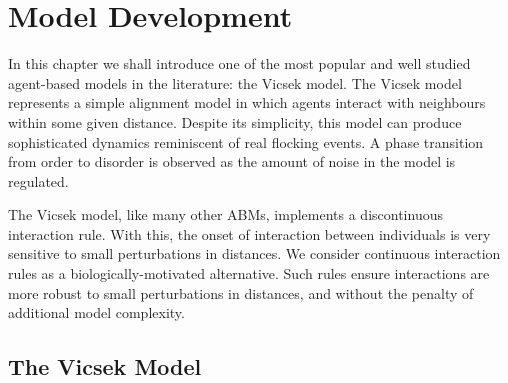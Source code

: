 \graphicspath{{fig/model_development/}}

\chapter{Model Development}
\label{cha:model_dev}

In this chapter we shall introduce one of the most popular and well studied agent-based
models in the literature: the Vicsek model. The Vicsek model represents a simple alignment
model in which agents interact with neighbours within some given distance. Despite its
simplicity, this model can produce sophisticated dynamics reminiscent of real flocking
events. A phase transition from order to disorder is observed as the amount of noise in
the model is regulated.

The Vicsek model, like many other ABMs, implements a discontinuous interaction rule. With
this, the onset of interaction between individuals is very sensitive to small perturbations
in distances. We consider continuous interaction rules as a biologically-motivated
alternative. Such rules ensure interactions are more robust to small perturbations in
distances, and without the penalty of additional model complexity.

\section{The Vicsek Model}

